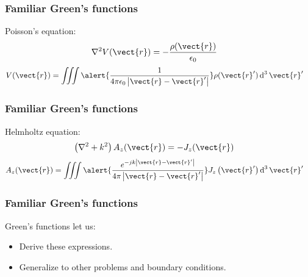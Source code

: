 \documentclass[12 pt, compress, handout, intlimits]{beamer}
\renewcommand{\d}{\operatorname{d}}
\begin{document}
\begin{frame}[fragile]
    \frametitle{Familiar Green's functions}

    Poisson's equation:
    \begin{align*}
        \nabla^2 V(\vect{r}) &= - \frac{\rho(\vect{r})}{\epsilon_0}
    \end{align*}
    \begin{align*}
        V(\vect{r}) &= \iiint \alert{\frac{1}{4 \pi \epsilon_0 \left| \vect{r} - \vect{r}' \right|}} \rho(\vect{r}') \d^3 \vect{r}'
    \end{align*}
\end{frame}


\begin{frame}[fragile]
    \frametitle{Familiar Green's functions}
    
    Helmholtz equation:
    \begin{align*}
        \left( \nabla^2 + k^2 \right) A_z(\vect{r}) &= -J_z(\vect{r})
    \end{align*}
    \begin{align*}
        A_z(\vect{r}) &= \iiint \alert{\frac{e^{-jk \left| \vect{r} - \vect{r}' \right|}}{4 \pi \left| \vect{r} - \vect{r}' \right|}} J_z\left( \vect{r}' \right) \d^3 \vect{r}'
    \end{align*}
\end{frame}


\begin{frame}[fragile]
    \frametitle{Familiar Green's functions}
    
    Green's functions let us:
    \begin{itemize}
    \item
        Derive these expressions.
    \item
        Generalize to other problems and boundary conditions.
    \end{itemize}
    
\end{frame}
\end{document}
